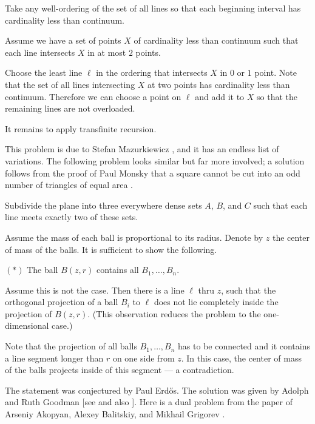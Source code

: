 Take any well-ordering of the set of all lines
so that each beginning interval has cardinality less than continuum.

Assume we have a set of points $X$ of cardinality less than continuum such that each line intersects $X$ in at most $2$ points.

Choose the least line $\ell$ in the ordering that intersects $X$ 
in $0$ or $1$ point.
Note that the set of all lines intersecting $X$ at two points has cardinality less than continuum.
Therefore we can choose a point on $\ell$ and add it to $X$ so that the remaining lines are not overloaded.

It remains to apply transfinite recursion.
\qeds

This problem is due to Stefan Mazurkiewicz \cite{mazurkiewicz1914}, and it has an endless list of variations.
The following problem looks similar but far more involved;
a solution follows from the proof of Paul Monsky that a square cannot be cut into an odd number of triangles of equal area \cite{monsky}.

\begin{pr}
Subdivide the plane into three everywhere dense sets $A$, $B$, and $C$ such that each line meets exactly two of these sets.
\end{pr}


Assume the mass of each ball is proportional to its radius.
Denote by $z$  the center of mass of the balls.
It is sufficient to show the following.
\begin{cl}{$({*})$}
The ball $B(z,r)$ contains all $B_1,\ldots,B_n$.
\end{cl}

Assume this is not the case.
Then there is a line $\ell$ thru $z$, 
such that the orthogonal projection of a ball $B_i$ to $\ell$ 
does not lie completely inside the projection of $B(z,r)$.
(This observation reduces the problem to the one-dimensional case.)

Note that the projection of all balls $B_1,\ldots,B_n$ has to be connected and it contains a line segment longer than $r$ on one side from $z$.
In this case, the center of mass of the balls projects inside of this segment --- a contradiction.
\qeds

The statement was conjectured by Paul Erdős.
The solution was given by Adolph and Ruth Goodman
[see  and also ].
Here is a dual problem from the paper of Arseniy Akopyan, Alexey Balitskiy, and Mikhail Grigorev \cite{akopyan-balitskiy-grigorev}.

